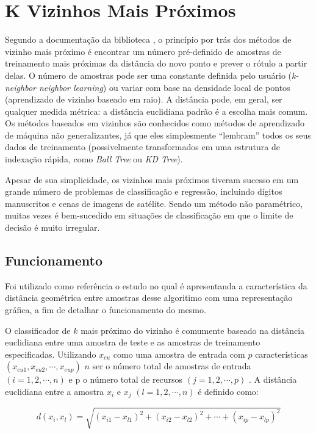 \section{K Vizinhos Mais Próximos}

Segundo a documentação da biblioteca \cite{scikitlearn}, o princípio por trás dos métodos de vizinho mais próximo é encontrar um número pré-definido de amostras de treinamento mais próximas da distância do novo ponto e prever o rótulo a partir delas. O número de amostras pode ser uma constante definida pelo usuário (\textit{k-neighbor neighbor learning}) ou variar com base na densidade local de pontos (aprendizado de vizinho baseado em raio). A distância pode, em geral, ser qualquer medida métrica: a distância euclidiana padrão é a escolha mais comum. Os métodos baseados em vizinhos são conhecidos como métodos de aprendizado de máquina não generalizantes, já que eles simplesmente “lembram” todos os seus dados de treinamento (possivelmente transformados em uma estrutura de indexação rápida, como \textit{Ball Tree} ou \textit{KD Tree}).

Apesar de sua simplicidade, os vizinhos mais próximos tiveram sucesso em um grande número de problemas de classificação e regressão, incluindo dígitos manuscritos e cenas de imagens de satélite. Sendo um método não paramétrico, muitas vezes é bem-sucedido em situações de classificação em que o limite de decisão é muito irregular.

\subsection{Funcionamento}

Foi utilizado como referência o estudo \cite{peterson2009k} no qual é apresentanda a característica da distância geométrica entre amostras desse algoritimo com uma representação gráfica, a fim de detalhar o funcionamento do mesmo.

O classificador de $ k $ mais próximo do vizinho é comumente baseado na distância euclidiana entre uma amostra de teste e as amostras de treinamento especificadas. Utilizando $ x_{eu} $ como uma amostra de entrada com $ p $ características $ (x_{eu1},x_{eu2},\cdots ,x_{eup}) $ $ n $ ser o número total de amostras de entrada $ (i=1,2,\cdots,n) $ e p o número total de recursos $ (j=1,2,\cdots,p) $ . A distância euclidiana entre a amostra $ x_{i} $ e $ x_{j} $ $ (l=1,2,\cdots,n) $  é definido como:

\begin{equation} \label{eq:diseuclidiana}
    d(x_{i},x_{l})=\sqrt{(x_{i1}-x_{l1})^{2}+(x_{i2}-x_{l2})^{2}+\cdots+(x_{ip}-x_{lp})^{2}}
\end{equation}



